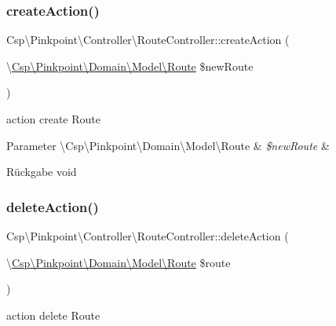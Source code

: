 \subsubsection{\texorpdfstring{create\+Action()}{createAction()}}
{\footnotesize\ttfamily Csp\textbackslash{}\+Pinkpoint\textbackslash{}\+Controller\textbackslash{}\+Route\+Controller\+::create\+Action (\begin{DoxyParamCaption}\item[{\textbackslash{}\hyperlink{classCsp_1_1Pinkpoint_1_1Domain_1_1Model_1_1Route}{Csp\textbackslash{}\+Pinkpoint\textbackslash{}\+Domain\textbackslash{}\+Model\textbackslash{}\+Route}}]{\$new\+Route }\end{DoxyParamCaption})}

action create Route


\begin{DoxyParams}[1]{Parameter}
\textbackslash{}\+Csp\textbackslash{}\+Pinkpoint\textbackslash{}\+Domain\textbackslash{}\+Model\textbackslash{}\+Route & {\em \$new\+Route} & \\
\hline
\end{DoxyParams}
\begin{DoxyReturn}{Rückgabe}
void 
\end{DoxyReturn}
\mbox{\label{classCsp_1_1Pinkpoint_1_1Controller_1_1RouteController_a6dd36680a41f2655d8e46488f2b687ad}} 
\subsubsection{\texorpdfstring{delete\+Action()}{deleteAction()}}
{\footnotesize\ttfamily Csp\textbackslash{}\+Pinkpoint\textbackslash{}\+Controller\textbackslash{}\+Route\+Controller\+::delete\+Action (\begin{DoxyParamCaption}\item[{\textbackslash{}\hyperlink{classCsp_1_1Pinkpoint_1_1Domain_1_1Model_1_1Route}{Csp\textbackslash{}\+Pinkpoint\textbackslash{}\+Domain\textbackslash{}\+Model\textbackslash{}\+Route}}]{\$route }\end{DoxyParamCaption})}

action delete Route


